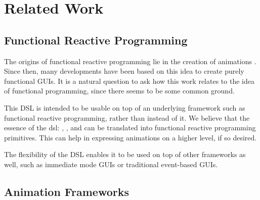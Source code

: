 \section{Related Work}
\label{sec:related}

\subsection{Functional Reactive Programming}
The origins of functional reactive programming lie in the creation of animations \cite{DBLP:conf/icfp/ElliottH97}. Since then, many developments have been based on this idea to create purely functional GUIs. It is a natural question to ask how this work relates to the idea of functional programming, since there seems to be some common ground.

This DSL is intended to be usable on top of an underlying framework such as functional reactive programming, rather than instead of it. We believe that the essence of the dsl: , , and  can be translated into functional reactive programming primitives. This can help in expressing animations on a higher level, if so desired.

The flexibility of the DSL enables it to be used on top of other frameworks as well, such as immediate mode GUIs or traditional event-based GUIs.

\subsection{Animation Frameworks}

